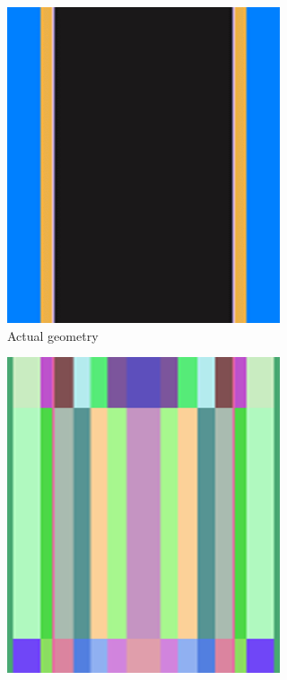 \begin{figure}
    \centering
    \begin{subfigure}[b]{0.25\textwidth}
        \centering
        \includegraphics[width=\textwidth]{figs/sec_1a.png}
        \caption{Actual geometry}
        \label{fig_1a}
    \end{subfigure}
    \hspace{6em}
    \begin{subfigure}[b]{0.25\textwidth}
        \centering
        \includegraphics[width=\textwidth]{figs/sec_1b.png}

\end{subfigure}
\end{figure}
